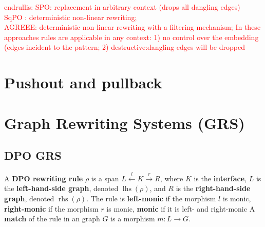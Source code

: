 \textcolor{red}{endrullis: 
SPO: replacement in arbitrary context (drops all dangling edges)\\
SqPO : deterministic non-linear rewriting;\\
AGREEE: deterministic non-linear rewriting with a filtering mechanism;
In these approaches rules are applicable in any context: 1) no control over the embedding (edges incident to the pattern; 2) destructive:dangling edges will be dropped
}

\section{Pushout and pullback}
    \label{sec:category_theory}
    

\section{Graph Rewriting Systems (GRS)} 

\subsection{DPO GRS}
\begin{definition}
    \label{def:grs:dpo_rule}
  A \textbf{DPO rewriting rule} $\rho$ is a span \( L \overset{l}{\leftarrow} K \overset{r}{\rightarrow} R \), where \( K \) is the \textbf{interface}, \( L \) is the \textbf{left-hand-side graph}, denoted \( \operatorname{lhs}(\rho) \), and \( R \) is the \textbf{right-hand-side graph}, denoted \( \operatorname{rhs}(\rho) \). The rule is \textbf{left-monic} if the morphism \( l \) is monic, \textbf{right-monic} if the morphism \( r \) is monic, \textbf{monic} if it is left- and right-monic   
  A \textbf{match} of the rule in an graph \( G \) is a morphism \( m: L \mathop{\rightarrow} G \).   
  \end{definition}

